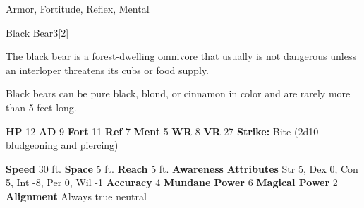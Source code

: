     
     Armor,
     Fortitude,
     Reflex,
     Mental
  
  
      
  \begin{monsection}{Black Bear}{3}[2]
    \vspace{-1em}\vspace{-1em}
    \vspace{0em}

    
      The black bear is a forest-dwelling omnivore that usually is not dangerous unless an interloper threatens its cubs or food supply.

      Black bears can be pure black, blond, or cinnamon in color and are rarely more than 5 feet long.
    
    

    \begin{spellcontent}
      \begin{spelltargetinginfo}
        \pari \textbf{HP} 12 \monsep
          \textbf{AD} 9 \monsep
          \textbf{Fort} 11 \monsep
          \textbf{Ref} 7 \monsep
          \textbf{Ment} 5
        \pari \textbf{WR} 8 \monsep
        \textbf{VR} 27
        \pari \textbf{Strike:}
            Bite  (2d10 bludgeoning and piercing)
      \end{spelltargetinginfo}
    \end{spellcontent}
    \begin{monsterfooter}
      \pari \textbf{Speed} 30 ft. \monsep
        \textbf{Space} 5 ft. \monsep
        \textbf{Reach} 5 ft.
      \pari \textbf{Awareness} 
      \pari \textbf{Attributes}
        Str 5, Dex 0,
        Con 5, Int -8,
        Per 0, Wil -1
      \pari \textbf{Accuracy} 4 \monsep
        \textbf{Mundane Power} 6 \monsep
      \textbf{Magical Power} 2
      \pari \textbf{Alignment} Always true neutral
    \end{monsterfooter}
  \end{monsection}
  
